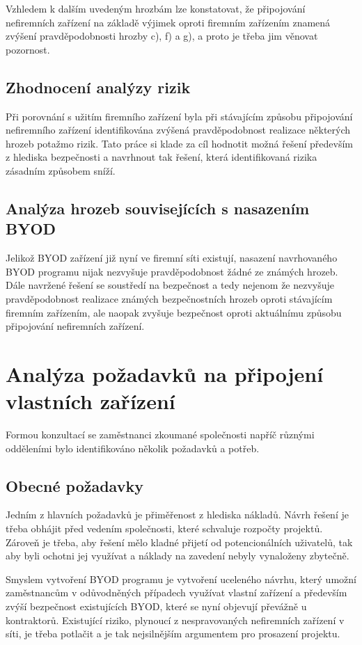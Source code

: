 Vzhledem k dalším uvedeným hrozbám lze konstatovat, že připojování nefiremních zařízení na základě výjimek oproti firemním zařízením znamená zvýšení pravděpodobnosti hrozby c), f) a g), a proto je třeba jim věnovat pozornost. 

\subsection{Zhodnocení analýzy rizik}
Při porovnání s užitím firemního zařízení byla při stávajícím způsobu připojování nefiremního zařízení identifikována zvýšená pravděpodobnost realizace některých hrozeb potažmo rizik. Tato práce si klade za cíl hodnotit možná řešení především z hlediska bezpečnosti a navrhnout tak řešení, která identifikovaná rizika zásadním způsobem sníží.

\subsection{Analýza hrozeb souvisejících s nasazením BYOD}
Jelikož BYOD zařízení již nyní ve firemní síti existují, nasazení navrhovaného BYOD programu nijak nezvyšuje pravděpodobnost žádné ze známých hrozeb. Dále navržené řešení se soustředí na bezpečnost a tedy nejenom že nezvyšuje pravděpodobnost realizace známých bezpečnostních hrozeb oproti stávajícím firemním zařízením, ale naopak zvyšuje bezpečnost oproti aktuálnímu způsobu připojování nefiremních zařízení.


\section{Analýza požadavků na připojení vlastních zařízení} 
Formou konzultací se zaměstnanci zkoumané společnosti napříč různými odděleními bylo identifikováno několik požadavků a potřeb.

\subsection{Obecné požadavky}

Jedním z hlavních požadavků je přiměřenost z hlediska nákladů. Návrh řešení je třeba obhájit před vedením společnosti, které schvaluje rozpočty projektů. Zároveň je třeba, aby řešení mělo kladné přijetí od potencionálních uživatelů, tak aby byli ochotni jej využívat a náklady na zavedení nebyly vynaloženy zbytečně.  

Smyslem vytvoření BYOD programu je vytvoření uceleného návrhu, který umožní zaměstnancům v odůvodněných případech využívat vlastní zařízení a především zvýší bezpečnost existujících BYOD, které se nyní objevují převážně u kontraktorů. Existující riziko, plynoucí z nespravovaných nefiremních zařízení v síti, je třeba potlačit a je tak nejsilnějším argumentem pro prosazení projektu.

